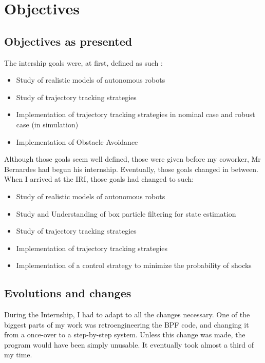 \chapter{Objectives}

\label{theme}


\section{Objectives as presented}

The intership goals were, at first, defined as such :
\begin{itemize}
  \item Study of realistic models of autonomous robots
  \item Study of trajectory tracking strategies
  \item Implementation of trajectory tracking strategies in nominal case and robust case (in simulation)
  \item Implementation of Obstacle Avoidance
\end{itemize}

Although those goals seem well defined, those were given before my coworker, Mr Bernardes had begun his internship.
Eventually, those goals changed in between.
When I arrived at the IRI, those goals had changed to such:

\begin{itemize}
  \item Study of realistic models of autonomous robots
  \item Study and Understanding of box particle filtering for state estimation
  \item Study of trajectory tracking strategies
  \item Implementation of trajectory tracking strategies
  \item Implementation of a control strategy to minimize the probability of shocks
\end{itemize}

\section{Evolutions and changes}

During the Internship, I had to adapt to all the changes necessary.
One of the biggest parts of my work was retroengineering the BPF code, and changing it from a once-over to a step-by-step system.
Unless this change was made, the program would have been simply unusable. It eventually took almost a third of my time.\\


